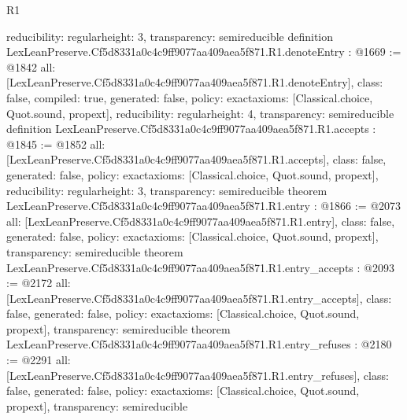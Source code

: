 \begin{lexlean}{R1}
\begin{coremodule}
{  reducibility: regular{height: 3},
  transparency: semireducible
}
definition LexLeanPreserve.Cf5d8331a0c4c9ff9077aa409aea5f871.R1.denoteEntry : @1669 := @1842 {
  all: [LexLeanPreserve.Cf5d8331a0c4c9ff9077aa409aea5f871.R1.denoteEntry],
  class: false,
  compiled: true,
  generated: false,
  policy: exact{axioms: [Classical.choice, Quot.sound, propext]},
  reducibility: regular{height: 4},
  transparency: semireducible
}
definition LexLeanPreserve.Cf5d8331a0c4c9ff9077aa409aea5f871.R1.accepts : @1845 := @1852 {
  all: [LexLeanPreserve.Cf5d8331a0c4c9ff9077aa409aea5f871.R1.accepts],
  class: false,
  generated: false,
  policy: exact{axioms: [Classical.choice, Quot.sound, propext]},
  reducibility: regular{height: 3},
  transparency: semireducible
}
theorem LexLeanPreserve.Cf5d8331a0c4c9ff9077aa409aea5f871.R1.entry : @1866 := @2073 {
  all: [LexLeanPreserve.Cf5d8331a0c4c9ff9077aa409aea5f871.R1.entry],
  class: false,
  generated: false,
  policy: exact{axioms: [Classical.choice, Quot.sound, propext]},
  transparency: semireducible
}
theorem LexLeanPreserve.Cf5d8331a0c4c9ff9077aa409aea5f871.R1.entry_accepts : @2093 := @2172 {
  all: [LexLeanPreserve.Cf5d8331a0c4c9ff9077aa409aea5f871.R1.entry_accepts],
  class: false,
  generated: false,
  policy: exact{axioms: [Classical.choice, Quot.sound, propext]},
  transparency: semireducible
}
theorem LexLeanPreserve.Cf5d8331a0c4c9ff9077aa409aea5f871.R1.entry_refuses : @2180 := @2291 {
  all: [LexLeanPreserve.Cf5d8331a0c4c9ff9077aa409aea5f871.R1.entry_refuses],
  class: false,
  generated: false,
  policy: exact{axioms: [Classical.choice, Quot.sound, propext]},
  transparency: semireducible
}


\end{coremodule}
\end{lexlean}
